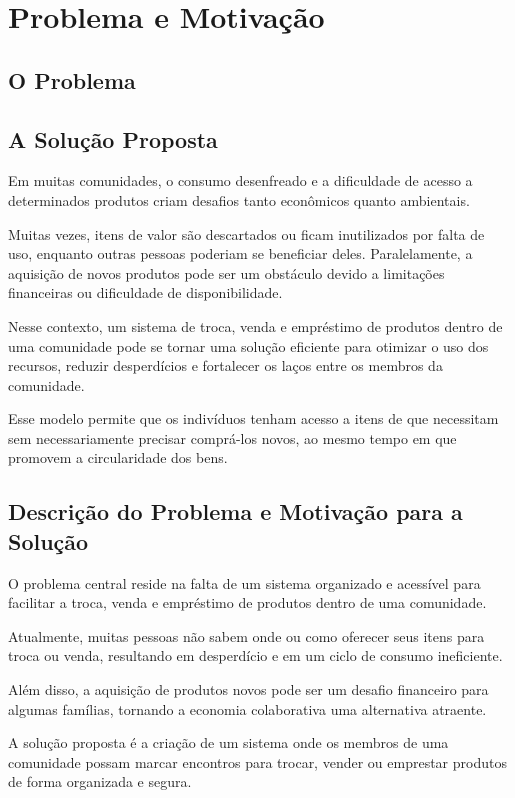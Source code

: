 \documentclass[a4paper, 12pt]{article} %
\begin{document}
\section{Problema e Motivação}

\subsection{O Problema}

\subsection{A Solução Proposta}

Em muitas comunidades, o consumo desenfreado e a dificuldade de acesso a determinados produtos criam desafios tanto econômicos quanto ambientais. 

Muitas vezes, itens de valor são descartados ou ficam inutilizados por falta de uso, enquanto outras pessoas poderiam se beneficiar deles. Paralelamente, a aquisição de novos produtos pode ser um obstáculo devido a limitações financeiras ou dificuldade de disponibilidade.

Nesse contexto, um sistema de troca, venda e empréstimo de produtos dentro de uma comunidade pode se tornar uma solução eficiente para otimizar o uso dos recursos, reduzir desperdícios e fortalecer os laços entre os membros da comunidade. 

Esse modelo permite que os indivíduos tenham acesso a itens de que necessitam sem necessariamente precisar comprá-los novos, ao mesmo tempo em que promovem a circularidade dos bens.

\subsection{Descrição do Problema e Motivação para a Solução}

O problema central reside na falta de um sistema organizado e acessível para facilitar a troca, venda e empréstimo de produtos dentro de uma comunidade. 

Atualmente, muitas pessoas não sabem onde ou como oferecer seus itens para troca ou venda, resultando em desperdício e em um ciclo de consumo ineficiente. 

Além disso, a aquisição de produtos novos pode ser um desafio financeiro para algumas famílias, tornando a economia colaborativa uma alternativa atraente.

A solução proposta é a criação de um sistema onde os membros de uma comunidade possam marcar encontros para trocar, vender ou emprestar produtos de forma organizada e segura. 
\end{document}
